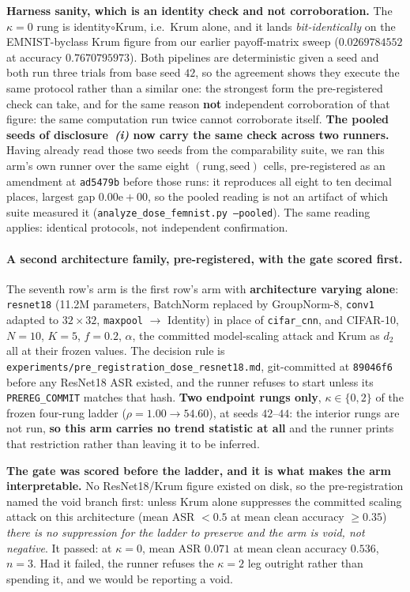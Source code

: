 \documentclass{article}
\begin{document}
\textbf{Harness sanity, which is an identity check and not corroboration.} The $\kappa{=}0$ rung is identity$\circ$Krum, i.e.\ Krum alone, and it lands \emph{bit-identically} on the EMNIST-byclass Krum figure from our earlier payoff-matrix sweep ($0.0269784552$ at accuracy $0.7670795973$). Both pipelines are deterministic given a seed and both run three trials from base seed $42$, so the agreement shows they execute the same protocol rather than a similar one: the strongest form the pre-registered check can take, and for the same reason \textbf{not} independent corroboration of that figure: the same computation run twice cannot corroborate itself. \textbf{The pooled seeds of disclosure~\emph{(i)} now carry the same check across two runners.} Having already read those two seeds from the comparability suite, we ran this arm's own runner over the same eight $(\text{rung},\text{seed})$ cells, pre-registered as an amendment at \texttt{ad5479b} before those runs: it reproduces all eight to ten decimal places, largest gap $0.00\mathrm{e}{+}00$, so the pooled reading is not an artifact of which suite measured it (\texttt{analyze\_dose\_femnist.py --pooled}). The same reading applies: identical protocols, not independent confirmation.

\paragraph{A second architecture family, pre-registered, with the gate scored first.} The seventh row's arm is the first row's arm with \textbf{architecture varying alone}: \texttt{resnet18} (11.2M parameters, BatchNorm replaced by GroupNorm-8, \texttt{conv1} adapted to $32{\times}32$, \texttt{maxpool} $\to$ Identity) in place of \texttt{cifar\_cnn}, and CIFAR-10, $N{=}10$, $K{=}5$, $f{=}0.2$, $\alpha$, the committed model-scaling attack and Krum as $d_2$ all at their frozen values. The decision rule is \texttt{experiments/\allowbreak pre\_registration\_dose\_resnet18.md}, git-committed at \texttt{89046f6} before any ResNet18 ASR existed, and the runner refuses to start unless its \texttt{PREREG\_COMMIT} matches that hash. \textbf{Two endpoint rungs only}, $\kappa \in \{0,2\}$ of the frozen four-rung ladder ($\rho = 1.00 \to 54.60$), at seeds $42$--$44$: the interior rungs are not run, \textbf{so this arm carries no trend statistic at all} and the runner prints that restriction rather than leaving it to be inferred.

\textbf{The gate was scored before the ladder, and it is what makes the arm interpretable.} No ResNet18/Krum figure existed on disk, so the pre-registration named the void branch first: unless Krum alone suppresses the committed scaling attack on this architecture (mean ASR $< 0.5$ at mean clean accuracy $\ge 0.35$) \emph{there is no suppression for the ladder to preserve and the arm is void, not negative}. It passed: at $\kappa{=}0$, mean ASR $0.071$ at mean clean accuracy $0.536$, $n{=}3$. Had it failed, the runner refuses the $\kappa{=}2$ leg outright rather than spending it, and we would be reporting a void.
\end{document}
